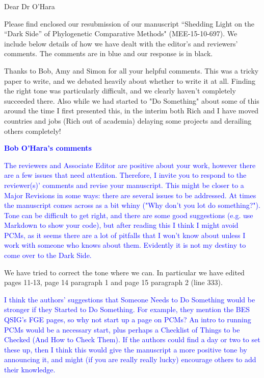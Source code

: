 \documentclass[12pt]{letter}
\begin{document}
\begin{letter}{}
\opening{Dear Dr O'Hara}

Please find enclosed our resubmission of our manuscript ``Shedding Light on the ``Dark Side'' of Phylogenetic Comparative Methods" (MEE-15-10-697). We include below details of how we have dealt with the editor's and reviewers' comments. The comments are in blue and our response is in black.

Thanks to Bob, Amy and Simon for all your helpful comments. This was a tricky paper to write, and we debated heavily about whether to write it at all. Finding the right tone was particularly difficult, and we clearly haven't completely succeeded there. Also while we had started to "Do Something" about some of this around the time I first presented this, in the interim both Rich and I have moved countries and jobs (Rich out of academia) delaying some projects and derailing others completely!

\textcolor{blue}{\textbf{Bob O'Hara's comments}}

\textcolor{blue}{The reviewers and Associate Editor are positive about your work, however there are a few issues that need attention. Therefore, I invite you to respond to the reviewer(s)' comments and revise your manuscript. This might be closer to a Major Revisions in some ways: there are several issues to be addressed. At times the manuscript comes across as a bit whiny ("Why don't you lot do something?"). Tone can be difficult to get right, and there are some good suggestions (e.g. use Markdown to show your code), but after reading this I think I might avoid PCMs, as it seems there are a lot of pitfalls that I won't know about unless I work with someone who knows about them. Evidently it is not my destiny to come over to the Dark Side.}

We have tried to correct the tone where we can. In particular we have edited pages 11-13, page 14 paragraph 1 and page 15 paragraph 2 (line 333).

\textcolor{blue}{I think the authors' suggestions that Someone Needs to Do Something would be stronger if they Started to Do Something. For example, they mention the BES QSIG's FGE pages, so why not start up a page on PCMs? An intro to running PCMs would be a necessary start, plus perhaps a Checklist of Things to be Checked (And How to Check Them). If the authors could find a day or two to set these up, then I think this would give the manuscript a more positive tone by announcing it, and might (if you are really really lucky) encourage others to add their knowledge.}


\end{letter}
\end{document}
